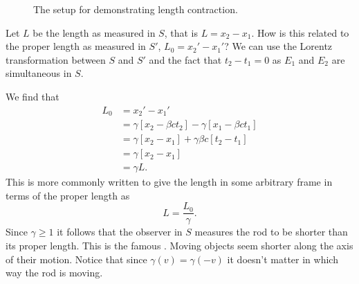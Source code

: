 \documentclass[fleqn]{NotesClass}
\begin{document}
    \begin{figure}
        \caption{The setup for demonstrating length contraction.}
        \label{fig:minkowski length contraction}
    \end{figure}
    
    Let \(L\) be the length as measured in \(S\), that is \(L = x_2 - x_1\).
    How is this related to the proper length as measured in \(S'\), \(L_0 = x_2' - x_1'\)?
    We can use the Lorentz transformation between \(S\) and \(S'\) and the fact that \(t_2 - t_1 = 0\) as \(E_1\) and \(E_2\) are simultaneous in \(S\).
    
    We find that
    \begin{align}
        L_0 &= x_2' - x_1'\\
        &= \gamma [x_2 - \beta ct_2] - \gamma [x_1 - \beta ct_1]\\
        &= \gamma [x_2 - x_1] + \gamma \beta c [t_2 - t_1]\\
        &= \gamma [x_2 - x_1]\\
        &= \gamma L.
    \end{align}
    This is more commonly written to give the length in some arbitrary frame in terms of the proper length as
    \begin{equation}
        L = \frac{L_0}{\gamma}.
    \end{equation}
    Since \(\gamma \ge 1\) it follows that the observer in \(S\) measures the rod to be shorter than its proper length.
    This is the famous .
    Moving objects seem shorter along the axis of their motion.
    Notice that since \(\gamma(v) = \gamma(-v)\) it doesn't matter in which way the rod is moving.
    
\end{document}
